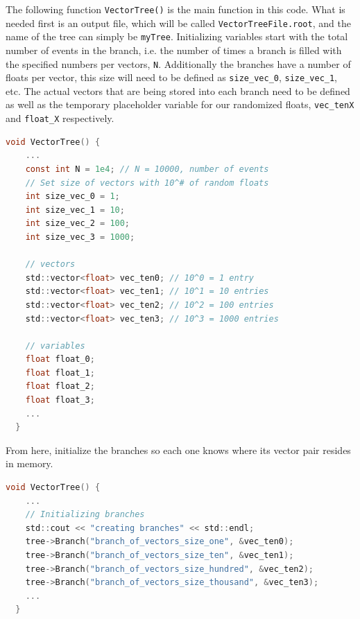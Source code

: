 The following function \verb|VectorTree()| is the main function in this code.
What is needed first is an output file, which will be called \verb|VectorTreeFile.root|, and the name of the tree can simply be \verb|myTree|.
Initializing variables start with the total number of events in the branch, i.e. the number of times a branch is filled with the specified numbers per vectors, \verb|N|. 
Additionally the branches have a number of floats per vector, this size will need to be defined as \verb|size_vec_0|, \verb|size_vec_1|, etc.  
The actual vectors that are being stored into each branch need to be defined as well as the temporary placeholder variable for our randomized floats, \verb|vec_tenX| and \verb|float_X| respectively. 
\begin{lstlisting}[language=C]  
  void VectorTree() {
    ...
    const int N = 1e4; // N = 10000, number of events
    // Set size of vectors with 10^# of random floats
    int size_vec_0 = 1;
    int size_vec_1 = 10;
    int size_vec_2 = 100;
    int size_vec_3 = 1000;

    // vectors
    std::vector<float> vec_ten0; // 10^0 = 1 entry
    std::vector<float> vec_ten1; // 10^1 = 10 entries
    std::vector<float> vec_ten2; // 10^2 = 100 entries
    std::vector<float> vec_ten3; // 10^3 = 1000 entries

    // variables
    float float_0;
    float float_1;
    float float_2;
    float float_3;
    ...
  }
\end{lstlisting}

From here, initialize the branches so each one knows where its vector pair resides in memory.
\begin{lstlisting}[language=C]  
  void VectorTree() {
    ...
    // Initializing branches
    std::cout << "creating branches" << std::endl;
    tree->Branch("branch_of_vectors_size_one", &vec_ten0);
    tree->Branch("branch_of_vectors_size_ten", &vec_ten1);
    tree->Branch("branch_of_vectors_size_hundred", &vec_ten2);
    tree->Branch("branch_of_vectors_size_thousand", &vec_ten3);
    ...
  }
\end{lstlisting}

